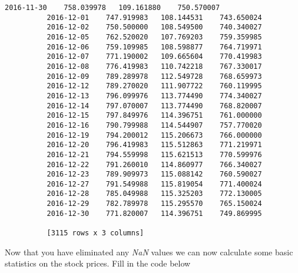 \documentclass[11pt]{article}
\begin{document}
\begin{Verbatim}[commandchars=\\\{\}]
          2016-11-30    758.039978   109.161880    750.570007
          2016-12-01    747.919983   108.144531    743.650024
          2016-12-02    750.500000   108.549500    740.340027
          2016-12-05    762.520020   107.769203    759.359985
          2016-12-06    759.109985   108.598877    764.719971
          2016-12-07    771.190002   109.665604    770.419983
          2016-12-08    776.419983   110.742218    767.330017
          2016-12-09    789.289978   112.549728    768.659973
          2016-12-12    789.270020   111.907722    760.119995
          2016-12-13    796.099976   113.774490    774.340027
          2016-12-14    797.070007   113.774490    768.820007
          2016-12-15    797.849976   114.396751    761.000000
          2016-12-16    790.799988   114.544907    757.770020
          2016-12-19    794.200012   115.206673    766.000000
          2016-12-20    796.419983   115.512863    771.219971
          2016-12-21    794.559998   115.621513    770.599976
          2016-12-22    791.260010   114.860977    766.340027
          2016-12-23    789.909973   115.088142    760.590027
          2016-12-27    791.549988   115.819054    771.400024
          2016-12-28    785.049988   115.325203    772.130005
          2016-12-29    782.789978   115.295570    765.150024
          2016-12-30    771.820007   114.396751    749.869995
          
          [3115 rows x 3 columns]
\end{Verbatim}
            
    Now that you have eliminated any \emph{NaN} values we can now calculate
some basic statistics on the stock prices. Fill in the code below
\end{document}

